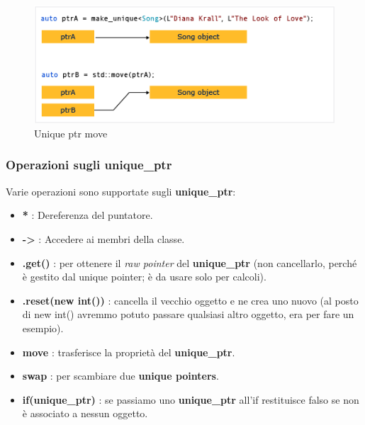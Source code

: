 \begin{figure}[H]
	\centering
	\includegraphics[width=1\textwidth, height=1\textheight, keepaspectratio]{./imgs/unique_ptr_move2.png}
	\caption{Unique ptr move}
	\label{fig:unique_ptr_move2}
\end{figure}

\subsubsection{Operazioni sugli unique\_ptr}

\textsf{\small Varie operazioni sono supportate sugli \textbf{unique\_ptr}: } \\

\begin{itemize}
	\item \textsf{\small \textbf{*} : Dereferenza del puntatore.}
	\item \textsf{\small \textbf{->} : Accedere ai membri della classe.}
	\item \textsf{\small \textbf{.get()} : per ottenere il \emph{raw pointer} del \textbf{unique\_ptr} (non cancellarlo, perché è gestito dal unique pointer; è da usare solo per calcoli).}
	\item \textsf{\small \textbf{.reset(new int())} : cancella il vecchio oggetto e ne crea uno nuovo (al posto di new int() avremmo potuto passare qualsiasi altro oggetto, era per fare un esempio).}
	\item \textsf{\small \textbf{move} : trasferisce la proprietà del \textbf{unique\_ptr}.}
	\item \textsf{\small \textbf{swap} : per scambiare due \textbf{unique pointers}.}
	\item \textsf{\small \textbf{if(unique\_ptr)} : se passiamo uno \textbf{unique\_ptr} all'if restituisce falso se non è associato a nessun oggetto.}
\end{itemize}

